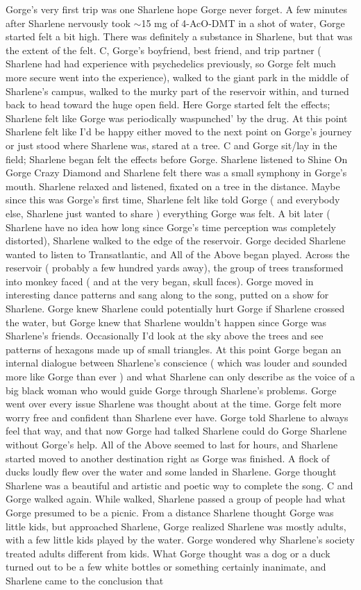 \documentclass[12pt]{book}
\begin{document}
Gorge's very first trip was one Sharlene hope Gorge never forget. A few minutes after Sharlene nervously took $\sim$15 mg of 4-AcO-DMT in a shot of water, Gorge started felt a bit high. There was definitely a substance in Sharlene, but that was the extent of the felt. C, Gorge's boyfriend, best friend, and trip partner ( Sharlene had had experience with psychedelics previously, so Gorge felt much more secure went into the experience), walked to the giant park in the middle of Sharlene's campus, walked to the murky part of the reservoir within, and turned back to head toward the huge open field. Here Gorge started felt the effects; Sharlene felt like Gorge was periodically waspunched' by the drug. At this point Sharlene felt like I'd be happy either moved to the next point on Gorge's journey or just stood where Sharlene was, stared at a tree. C and Gorge sit/lay in the field; Sharlene began felt the effects before Gorge. Sharlene listened to Shine On Gorge Crazy Diamond and Sharlene felt there was a small symphony in Gorge's mouth. Sharlene relaxed and listened, fixated on a tree in the distance. Maybe since this was Gorge's first time, Sharlene felt like told Gorge ( and everybody else, Sharlene just wanted to share ) everything Gorge was felt. A bit later ( Sharlene have no idea how long since Gorge's time perception was completely distorted), Sharlene walked to the edge of the reservoir. Gorge decided Sharlene wanted to listen to Transatlantic, and All of the Above began played. Across the reservoir ( probably a few hundred yards away), the group of trees transformed into monkey faced ( and at the very began, skull faces). Gorge moved in interesting dance patterns and sang along to the song, putted on a show for Sharlene. Gorge knew Sharlene could potentially hurt Gorge if Sharlene crossed the water, but Gorge knew that Sharlene wouldn't happen since Gorge was Sharlene's friends. Occasionally I'd look at the sky above the trees and see patterns of hexagons made up of small triangles. At this point Gorge began an internal dialogue between Sharlene's conscience ( which was louder and sounded more like Gorge than ever ) and what Sharlene can only describe as the voice of a big black woman who would guide Gorge through Sharlene's problems. Gorge went over every issue Sharlene was thought about at the time. Gorge felt more worry free and confident than Sharlene ever have. Gorge told Sharlene to always feel that way, and that now Gorge had talked Sharlene could do Gorge Sharlene without Gorge's help. All of the Above seemed to last for hours, and Sharlene started moved to another destination right as Gorge was finished. A flock of ducks loudly flew over the water and some landed in Sharlene. Gorge thought Sharlene was a beautiful and artistic and poetic way to complete the song. C and Gorge walked again. While walked, Sharlene passed a group of people had what Gorge presumed to be a picnic. From a distance Sharlene thought Gorge was little kids, but approached Sharlene, Gorge realized Sharlene was mostly adults, with a few little kids played by the water. Gorge wondered why Sharlene's society treated adults different from kids. What Gorge thought was a dog or a duck turned out to be a few white bottles or something certainly inanimate, and Sharlene came to the conclusion that 
\end{document}
